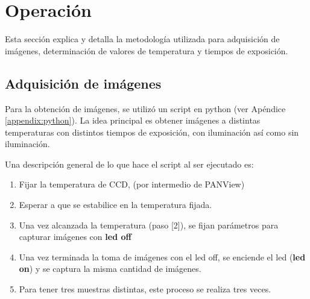 \documentclass[a4paper,10pt]{article}
\begin{document}
\section[1]{Operación}
Esta sección explica y detalla la metodología utilizada para adquisición de
imágenes, determinación de valores de temperatura y tiempos de exposición.

\subsection{Adquisición de imágenes}
Para la obtención de imágenes, se utilizó un script en python (ver Apéndice \ref{appendix:python}). La idea principal
es obtener imágenes a distintas temperaturas con distintos tiempos de exposición, con iluminación así como sin iluminación.

Una descripción general de lo que hace el script al ser ejecutado es:
\begin{enumerate}
\item Fijar la temperatura de CCD, (por intermedio de PANView) 
\item Esperar a que se estabilice en la temperatura fijada.
\item Una vez alcanzada la temperatura (paso [2]), se fijan parámetros para capturar imágenes con \textbf{led off}
\item Una vez terminada la toma de imágenes con el led off, se enciende el led (\textbf{led on}) y se captura la misma cantidad de imágenes.
\item Para tener tres muestras distintas, este proceso se realiza tres veces.
\end{enumerate}
\end{document}
